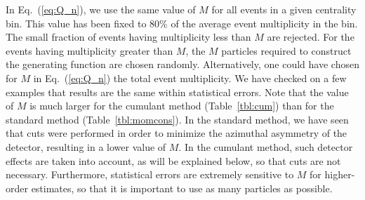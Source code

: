 \documentclass[aps,prc,superscriptaddress,showpacs,floatfix,nofootinbib]{revtex4}
\begin{document}
In Eq.~(\ref{eq:Q_n}), we use the same value of $M$ for all
events in a given centrality bin. This value has been fixed to 80\% of
the average event multiplicity in the bin. The small fraction of
events having multiplicity less than $M$ are rejected. For the events
having multiplicity greater than $M$, the $M$ particles required to
construct the generating function are chosen randomly. Alternatively,
one could have chosen for $M$ in Eq.~(\ref{eq:Q_n}) the total event
multiplicity. We have checked on a few examples that results are the
same within statistical errors. Note that the value of $M$ is much
larger for the cumulant method (Table~\ref{tbl:cum}) than for the
standard method (Table~\ref{tbl:momcons}). In the standard method, we
have seen that cuts were performed in order to minimize the azimuthal
asymmetry of the detector, resulting in a lower value of $M$. In the
cumulant method, such detector effects are taken into account, as will
be explained below, so that cuts are not necessary. Furthermore,
statistical errors are extremely sensitive to $M$ for higher-order
estimates, so that it is important to use as many particles as
possible.
\end{document}
